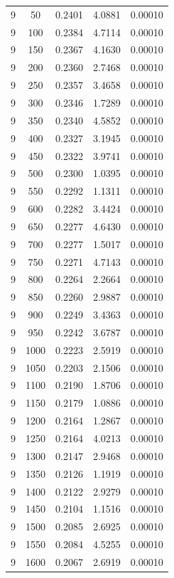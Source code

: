 \begin{longtable}{ccccc}
    9 & 50 & 0.2401 & 4.0881 & 0.00010 \\
    9 & 100 & 0.2384 & 4.7114 & 0.00010 \\
    9 & 150 & 0.2367 & 4.1630 & 0.00010 \\
    9 & 200 & 0.2360 & 2.7468 & 0.00010 \\
    9 & 250 & 0.2357 & 3.4658 & 0.00010 \\
    9 & 300 & 0.2346 & 1.7289 & 0.00010 \\
    9 & 350 & 0.2340 & 4.5852 & 0.00010 \\
    9 & 400 & 0.2327 & 3.1945 & 0.00010 \\
    9 & 450 & 0.2322 & 3.9741 & 0.00010 \\
    9 & 500 & 0.2300 & 1.0395 & 0.00010 \\
    9 & 550 & 0.2292 & 1.1311 & 0.00010 \\
    9 & 600 & 0.2282 & 3.4424 & 0.00010 \\
    9 & 650 & 0.2277 & 4.6430 & 0.00010 \\
    9 & 700 & 0.2277 & 1.5017 & 0.00010 \\
    9 & 750 & 0.2271 & 4.7143 & 0.00010 \\
    9 & 800 & 0.2264 & 2.2664 & 0.00010 \\
    9 & 850 & 0.2260 & 2.9887 & 0.00010 \\
    9 & 900 & 0.2249 & 3.4363 & 0.00010 \\
    9 & 950 & 0.2242 & 3.6787 & 0.00010 \\
    9 & 1000 & 0.2223 & 2.5919 & 0.00010 \\
    9 & 1050 & 0.2203 & 2.1506 & 0.00010 \\
    9 & 1100 & 0.2190 & 1.8706 & 0.00010 \\
    9 & 1150 & 0.2179 & 1.0886 & 0.00010 \\
    9 & 1200 & 0.2164 & 1.2867 & 0.00010 \\
    9 & 1250 & 0.2164 & 4.0213 & 0.00010 \\
    9 & 1300 & 0.2147 & 2.9468 & 0.00010 \\
    9 & 1350 & 0.2126 & 1.1919 & 0.00010 \\
    9 & 1400 & 0.2122 & 2.9279 & 0.00010 \\
    9 & 1450 & 0.2104 & 1.1516 & 0.00010 \\
    9 & 1500 & 0.2085 & 2.6925 & 0.00010 \\
    9 & 1550 & 0.2084 & 4.5255 & 0.00010 \\
    9 & 1600 & 0.2067 & 2.6919 & 0.00010 \\

\end{longtable}
